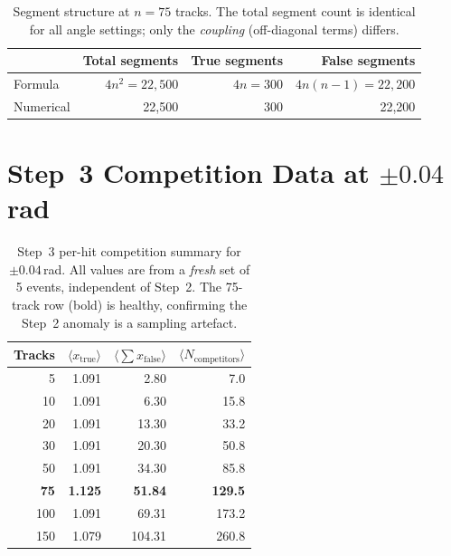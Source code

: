 \documentclass[12pt,a4paper]{article}
\begin{document}
\begin{table}[h!]
  \centering
  \caption{Segment structure at $n=75$ tracks.
    The total segment count is identical for all angle settings; only the
    \emph{coupling} (off-diagonal terms) differs.}
  \label{tab:segs75}
  \begin{tabular}{lrrr}
    \toprule
    & Total segments & True segments & False segments \\
    \midrule
    Formula   & $4n^2 = 22{,}500$ & $4n = 300$ & $4n(n-1) = 22{,}200$ \\
    Numerical & 22{,}500          & 300        & 22{,}200              \\
    \bottomrule
  \end{tabular}
\end{table}

\section{Step~3 Competition Data at $\pm0.04$\,rad}
\label{app:step3}

\begin{table}[h!]
  \centering
  \caption{Step~3 per-hit competition summary for $\pm0.04$\,rad.
    All values are from a \emph{fresh} set of 5 events, independent of Step~2.
    The 75-track row (bold) is healthy, confirming the Step~2 anomaly is a
    sampling artefact.}
  \label{tab:step3_004}
  \begin{tabular}{rrrr}
    \toprule
    Tracks & $\langle x_\text{true}\rangle$ & $\langle\sum x_\text{false}\rangle$
    & $\langle N_\text{competitors}\rangle$ \\
    \midrule
    5   & 1.091 &  2.80 &   7.0 \\
    10  & 1.091 &  6.30 &  15.8 \\
    20  & 1.091 & 13.30 &  33.2 \\
    30  & 1.091 & 20.30 &  50.8 \\
    50  & 1.091 & 34.30 &  85.8 \\
    \textbf{75}  & \textbf{1.125} & \textbf{51.84} & \textbf{129.5} \\
    100 & 1.091 & 69.31 & 173.2 \\
    150 & 1.079 & 104.31 & 260.8 \\
    \bottomrule
  \end{tabular}
\end{table}
\end{document}
